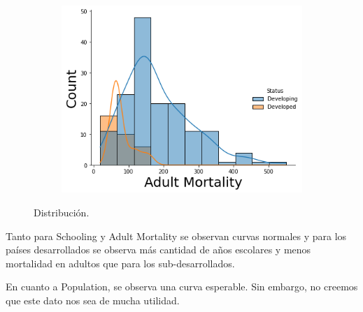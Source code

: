 \begin{itemize}
\begin{figure}[H]
\begin{subfigure}{0.3\linewidth}
                \centering
                \includegraphics[width=\textwidth]{img/41.png}
              \end{subfigure}
               \caption{Distribución.}
               
               \label{fig: 17}
        \end{figure}
        
Tanto para Schooling y Adult Mortality se observan curvas normales y para los países desarrollados se observa más cantidad de años escolares y menos mortalidad en adultos que para los sub-desarrollados. 
 
En cuanto a Population, se observa una curva esperable. Sin embargo, no creemos que este dato nos sea de mucha utilidad.        
     
\end{itemize}    
    
    
    
   